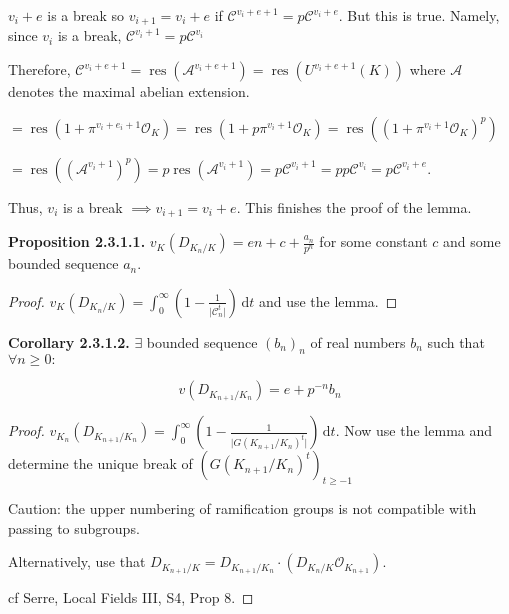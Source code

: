 \documentclass{article}
\theoremstyle{definition}
\numberwithin{theorem}{subsection}
\begin{document}
    \(v_i + e\) is a break so \(v_{i+1} = v_i + e\) if \(\mathscr{C}^{v_i + e + 1} = p \mathscr{C} ^{v_i + e}\). But this is true. Namely, since \(v_i\) is a break, \(\mathscr{C}^{v_i + 1} = p \mathscr{C}^{v_i}\)

    Therefore, \(\mathscr{C}^{v_i + e + 1} = \operatorname{res} (\mathscr{A}^{v_i + e + 1}) = \operatorname{res} (U^{v_i + e + 1}(K))\) where \(\mathscr{A}\) denotes the maximal abelian extension.

    \(= \operatorname{res} (1+\pi^{v_i + e_i + 1}\mathcal{O}_K) = \operatorname{res}(1 + p \pi^{v_i + 1}\mathcal{O}_K) = \operatorname{res}((1+ \pi^{v_i + 1} \mathcal{O}_K)^p)\) 

    \(= \operatorname{res}((\mathscr{A}^{v_i + 1})^p) = p \operatorname{res}(\mathscr{A}^{v_i + 1}) = p \mathscr{C}^{v_i + 1} = p p \mathscr{C}^{v_i} = p \mathscr{C}^{v_i + e}\).
    
    Thus, \(v_i\) is a break \(\implies v_{i+1} = v_i + e\). This finishes the proof of the lemma.
    
    \textbf{Proposition 2.3.1.1.} \(v_K(D_{K_n / K}) = en + c + \frac{a_n}{p^n}\) for some constant \(c\) and some bounded sequence \(a_n\).

    \begin{proof}
        \(v_K(D_{K_n / K}) = \int_{0}^{\infty} \left( 1 - \frac{1}{\vert \mathscr{C}_n^t \vert } \right) \,\mathrm{d}t\) and use the lemma.
    \end{proof}

    \textbf{Corollary 2.3.1.2.} \(\exists\) bounded sequence \((b_n)_n\) of real numbers \(b_n\) such that \(\forall n \geq 0:\)
    
    \[
        v(D_{K_{n+1} / K_n}) = e + p^{-n} b_n
    \]

    \begin{proof}
        \(v_{K_n}(D_{K_{n+1} / K_n}) = \int_{0}^{\infty} \left( 1 - \frac{1}{\vert G(K_{n+1} / K_n)^t \vert } \right)  \,\mathrm{d}t \). Now use the lemma and determine the unique break of \((G(K_{n+1} / K_n)^t)_{t\geq -1}\) 

        Caution: the upper numbering of ramification groups is not compatible with passing to subgroups.

        Alternatively, use that \(D_{K_{n+1} / K} = D_{K_{n+1} / K_n} \cdot (D_{K_n / K} \mathcal{O}_{K_{n+1}})\).
        
        cf Serre, Local Fields III, S4, Prop 8.
    \end{proof}
\end{document}
